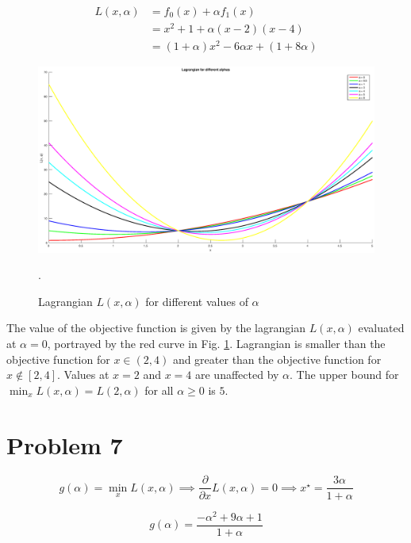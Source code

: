 \documentclass[12pt]{article}
\begin{document}
\begin{equation}
 \begin{align}
  L(x, \alpha) &= f_0(x) + \alpha f_1(x) \\
    &= x^2 + 1 + \alpha (x-2)(x-4) \\
    &= (1 + \alpha) x^2 - 6 \alpha x + (1 + 8 \alpha)
 \end{align}
\end{equation}



\begin{figure}[!ht] 
 \center
 \includegraphics[width=\textwidth]{prob6}
 \caption{Lagrangian $L(x, \alpha)$ for different values of $\alpha$}.
 \label{figprob6}
\end{figure}

The value of the objective function is given by the lagrangian $L(x, \alpha)$ evaluated at $\alpha = 0$, portrayed by the red curve in Fig. \ref{figprob6}. Lagrangian is smaller than the objective function for $x \in (2, 4)$ and greater than the objective function for $x \notin [2, 4]$. Values at $x = 2$ and $x = 4$ are unaffected by $\alpha$. The upper bound for $\min_x L(x, \alpha) = L(2, \alpha)$ for all $\alpha \geq 0$ is $5$.

\section*{Problem 7}

\begin{equation}
 g(\alpha) = \min_x L(x, \alpha) \implies \frac{\partial}{\partial x} L(x, \alpha) = 0 \implies x^\star = \frac{3 \alpha}{1 + \alpha}
\end{equation}

\begin{equation}
 g(\alpha) = \frac{- \alpha^2 + 9 \alpha + 1}{1 + \alpha}
\end{equation}
\end{document}
